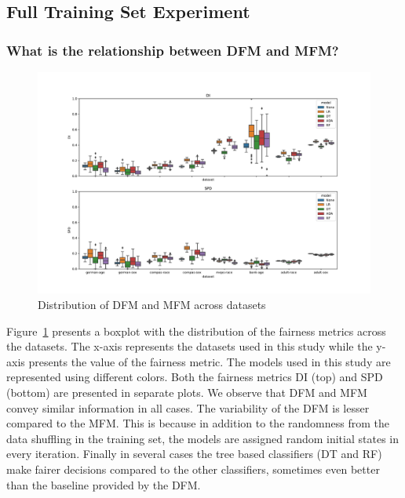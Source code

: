 \documentclass{article}
\begin{document}

\subsection{Full Training Set Experiment}\label{sec:results-full}
\subsubsection{What is the relationship between DFM and MFM?}\label{sec:results-full-rel}

\begin{figure}
  \centering
  \includegraphics[width=0.95\linewidth]{boxplot--dataset--di-spd--exp-full.pdf}
  \caption{Distribution of DFM and MFM across datasets}
  \label{fig:boxplot--dataset--di-spd--exp-full}
\end{figure}

Figure \ref{fig:boxplot--dataset--di-spd--exp-full} presents a boxplot
with the distribution of the fairness metrics across the datasets. The
x-axis represents the datasets used in this study while the y-axis
presents the value of the fairness metric. The models used in this
study are represented using different colors. Both the fairness
metrics DI (top) and SPD (bottom) are presented in separate plots. We
observe that DFM and MFM convey similar information in all cases. The
variability of the DFM is lesser compared to the MFM. This is because
in addition to the randomness from the data shuffling in the training
set, the models are assigned random initial states in every iteration.
Finally in several cases the tree based classifiers (DT and RF) make
fairer decisions compared to the other classifiers, sometimes even
better than the baseline provided by the DFM.
\end{document}
